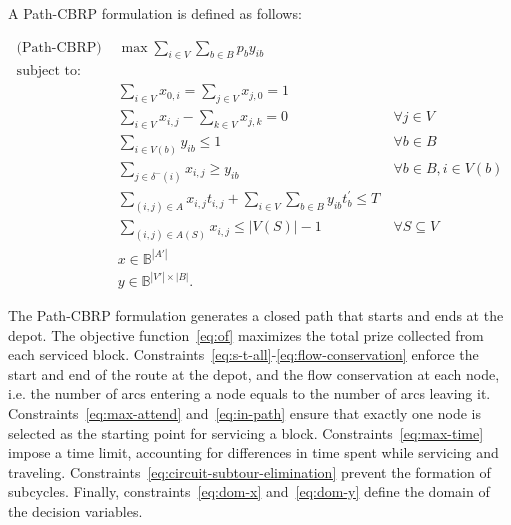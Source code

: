 A Path-CBRP formulation is defined as follows:
\allowdisplaybreaks

\begin{align}
	\text{(Path-CBRP) }          & \max \sum_{i \in V} \sum_{b \in B} p_b y_{ib}                                             & \label{eq:of}                                                  \\
	\nonumber \text{subject to:} &                                                                                           &                                                                \\
	                             & \sum_{i \in V} x_{0,i} = \sum_{j \in V} x_{j,0} = 1                                       & \label{eq:s-t-all}                                             \\
	                             & \sum_{i \in V} x_{i,j} - \sum_{k \in V} x_{j,k} = 0                                       & \ \forall j \in V \label{eq:flow-conservation}                 \\
	                             & \sum_{i \in V(b)} y_{ib} \leq 1                                                           & \ \forall b \in B \label{eq:max-attend}                        \\
	                             & \sum_{j \in \delta^{-}(i)} x_{i,j} \geq y_{ib}                                            & \ \forall b \in B, i \in V(b) \label{eq:in-path}               \\
	                             & \sum_{(i, j) \in A} x_{i,j}t_{i,j} + \sum_{i \in V} \sum_{b \in B} y_{ib}t^{'}_{b} \leq T & \label{eq:max-time}                                            \\
	                             & \sum_{(i, j) \in A(S)} x_{i,j} \leq |V(S)| - 1                                            & \ \forall S \subseteq V \label{eq:circuit-subtour-elimination} \\	
	                             & x \in \mathbb{B}^{|A'|}                                                                   & \label{eq:dom-x}                                               \\
	                             & y \in \mathbb{B}^{|V'| \times |B|}.                                                       & \label{eq:dom-y}
\end{align}


The Path-CBRP formulation generates a closed path that starts and ends at the
depot. The objective function~\eqref{eq:of} maximizes the total prize collected
from each serviced block.
Constraints~\eqref{eq:s-t-all}-\eqref{eq:flow-conservation} enforce the start
and end of the route at the depot, and the flow conservation at each node, i.e.
the number of arcs entering a node equals to the number of arcs leaving it.
Constraints~\eqref{eq:max-attend} and~\eqref{eq:in-path} ensure that exactly one
node is selected as the starting point for servicing a block.
Constraints~\eqref{eq:max-time} impose a time limit, accounting for differences
in time spent while servicing and traveling.
Constraints~\eqref{eq:circuit-subtour-elimination} prevent the formation of
subcycles. Finally, constraints~\eqref{eq:dom-x} and~\eqref{eq:dom-y} define the
domain of the decision variables.

